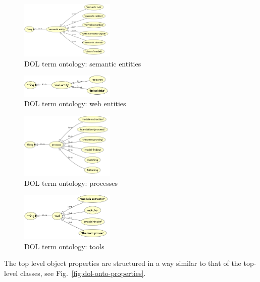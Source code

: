 \documentclass[10pt,fleqn,final]{scrreprt}
\newenvironment{definitions}[0]{\medskip }{}
\begin{document}
\begin{definitions}
\begin{figure}
  \centering
    \includegraphics[width=0.4\textwidth]{illustrations/semantic-entity.png}
  \caption{DOL term ontology: semantic entities}
  \label{fig:semantic-entity}
\end{figure}


\begin{figure}
  \centering
    \includegraphics[width=0.4\textwidth]{illustrations/web-entity.png}
  \caption{DOL term ontology: web entities}
  \label{fig:web-entity}
\end{figure}


\begin{figure}
  \centering
    \includegraphics[width=0.4\textwidth]{illustrations/process.png}
  \caption{DOL term ontology: processes}
  \label{fig:process}
\end{figure}


\begin{figure}
  \centering
    \includegraphics[width=0.4\textwidth]{illustrations/tool.png}
  \caption{DOL term ontology: tools}
  \label{fig:tool}
\end{figure}




The top level object properties are structured in a way similar 
to that of the top-level classes, see Fig.~\ref{fig:dol-onto-properties}.
\medskip


\end{definitions}
\end{document}
